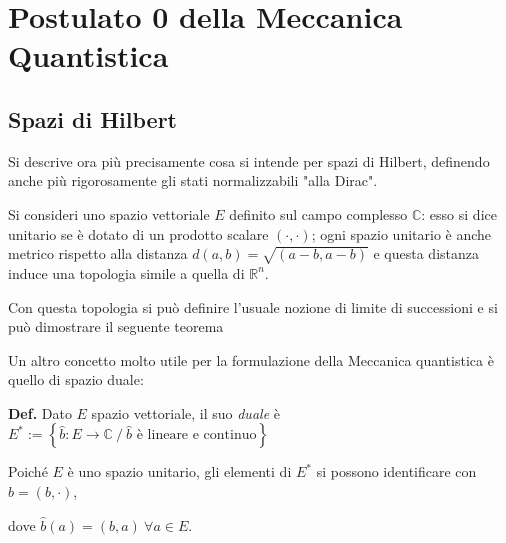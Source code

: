 \section{Postulato 0 della Meccanica Quantistica}

\noindent{}
\subsection{Spazi di Hilbert}
Si descrive ora più precisamente cosa si intende per spazi di Hilbert, definendo anche
più rigorosamente gli stati normalizzabili "alla Dirac".

Si consideri uno spazio vettoriale $ E $ definito sul campo complesso $ \mathbb{C} $:
esso si dice unitario se è dotato di un prodotto scalare $(\cdot,\cdot)$; ogni spazio
unitario è anche metrico rispetto alla distanza $ d(a,b) = \sqrt{(a-b,a-b)} $ e questa
distanza induce una topologia simile a quella di $ \mathbb{R}^n $.

Con questa topologia si può definire l'usuale nozione di limite di successioni e si 
può dimostrare il seguente teorema

\noindent{}


Un altro concetto molto utile per la formulazione della Meccanica quantistica è quello di
spazio duale:

\textbf{Def.} Dato $ E $ spazio vettoriale, il suo \textit{duale }è
$ E^* := \left\{ \hat{b}: E\to\mathbb{C}\: /\: \hat{b} \text{ è lineare e continuo} \right\} $

Poiché $ E $ è uno spazio unitario, gli elementi di $ E^* $ si possono identificare con
$ \hat{b} = (b,\cdot) $,

dove $ \hat{b}(a) = (b,a)\: \forall a\in E $.

